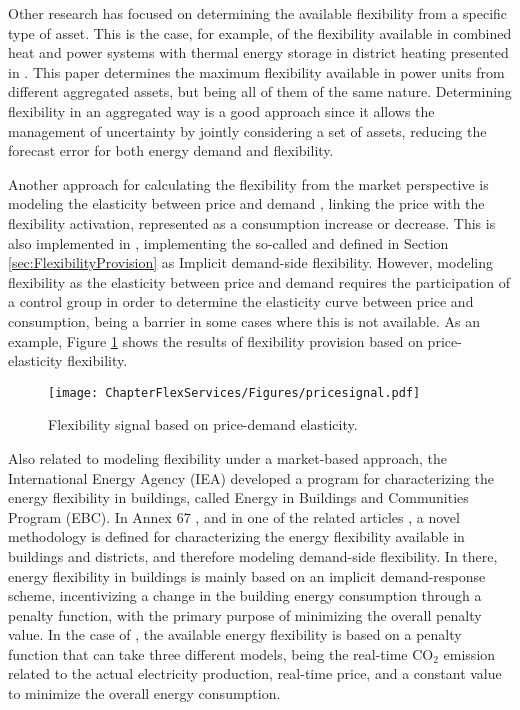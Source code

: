 
Other research has focused on determining the available flexibility from a specific type of asset. This is the case, for example, of the flexibility available in combined heat and power systems with thermal energy storage in district heating presented in \cite{nuytten2013flexibility}. This paper determines the maximum flexibility available in power units from different aggregated assets, but being all of them of the same nature. Determining flexibility in an aggregated way is a good approach since it allows the management of uncertainty by jointly considering a set of assets, reducing the forecast error for both energy demand and flexibility.  

Another approach for calculating the flexibility from the market perspective is modeling the elasticity between price and demand \cite{Gorria2013}, linking the price with the flexibility activation, represented as a consumption increase or decrease. This is also implemented in \cite{Moret2016}, implementing the so-called and defined in Section \ref{sec:FlexibilityProvision} as Implicit demand-side flexibility. However, modeling flexibility as the elasticity between price and demand requires the participation of a control group in order to determine the elasticity curve between price and consumption, being a barrier in some cases where this is not available. As an example, Figure \ref{fig:elasticity} shows the results of flexibility provision based on price-elasticity flexibility.

\begin{figure}[htbp]
	\centering
	\texttt{[image: ChapterFlexServices/Figures/pricesignal.pdf]}
		\caption{Flexibility signal based on price-demand elasticity.}
	\label{fig:elasticity}  
\end{figure}


Also related to modeling flexibility under a market-based approach, the International Energy Agency (IEA) developed a program for characterizing the energy flexibility in buildings, called Energy in Buildings and Communities Program (EBC). In Annex 67 \cite{Jensen2019}, and in one of the related articles \cite{Junker2018}, a novel methodology is defined for characterizing the energy flexibility available in buildings and districts, and therefore modeling demand-side flexibility. In there, energy flexibility in buildings is mainly based on an implicit demand-response scheme, incentivizing a change in the building energy consumption through a penalty function, with the primary purpose of minimizing the overall penalty value. In the case of \cite{Junker2018}, the available energy flexibility is based on a penalty function that can take three different models, being the real-time CO$_2$ emission related to the actual electricity production, real-time price, and a constant value to minimize the overall energy consumption. 


